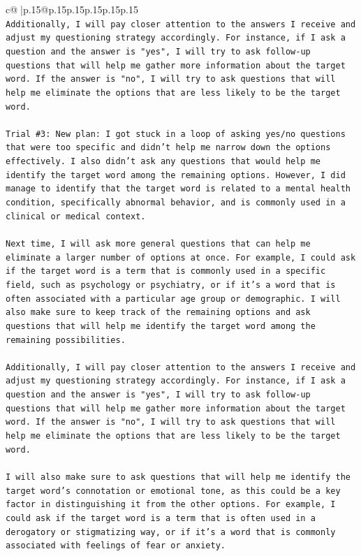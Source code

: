 \documentclass{article}
\begin{document}
{\begin{supertabular}{c@{$\;$}|p{.15\linewidth}@{}p{.15\linewidth}p{.15\linewidth}p{.15\linewidth}p{.15\linewidth}p{.15\linewidth}}
{{{\\ 
\texttt{Additionally, I will pay closer attention to the answers I receive and adjust my questioning strategy accordingly. For instance, if I ask a question and the answer is "yes", I will try to ask follow{-}up questions that will help me gather more information about the target word. If the answer is "no", I will try to ask questions that will help me eliminate the options that are less likely to be the target word.} \\
\\ 
\texttt{Trial \#3: New plan: I got stuck in a loop of asking yes/no questions that were too specific and didn't help me narrow down the options effectively. I also didn't ask any questions that would help me identify the target word among the remaining options. However, I did manage to identify that the target word is related to a mental health condition, specifically abnormal behavior, and is commonly used in a clinical or medical context. } \\
\\ 
\texttt{Next time, I will ask more general questions that can help me eliminate a larger number of options at once. For example, I could ask if the target word is a term that is commonly used in a specific field, such as psychology or psychiatry, or if it's a word that is often associated with a particular age group or demographic. I will also make sure to keep track of the remaining options and ask questions that will help me identify the target word among the remaining possibilities. } \\
\\ 
\texttt{Additionally, I will pay closer attention to the answers I receive and adjust my questioning strategy accordingly. For instance, if I ask a question and the answer is "yes", I will try to ask follow{-}up questions that will help me gather more information about the target word. If the answer is "no", I will try to ask questions that will help me eliminate the options that are less likely to be the target word.} \\
\\ 
\texttt{I will also make sure to ask questions that will help me identify the target word's connotation or emotional tone, as this could be a key factor in distinguishing it from the other options. For example, I could ask if the target word is a term that is often used in a derogatory or stigmatizing way, or if it's a word that is commonly associated with feelings of fear or anxiety.} \\
}}}
\end{supertabular}}
\end{document}
